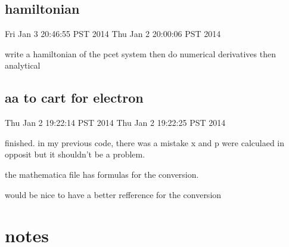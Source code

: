 \documentclass{article}
\begin{document}
\subsection{hamiltonian}
Fri Jan  3 20:46:55 PST 2014
Thu Jan  2 20:00:06 PST 2014
\label{sub:hamiltonian}

write a hamiltonian of the pcet system then do numerical derivatives then analytical

\subsection{aa to cart for electron}
Thu Jan  2 19:22:14 PST 2014
Thu Jan  2 19:22:25 PST 2014
\label{sub:aa_to_cart_for_electron}

finished. in my previous code, there was a mistake x and p were calculaed in opposit but it shouldn't be a problem.

the mathematica file has formulas for the conversion. 

would be nice to have a better refference for the conversion

\section{notes}
\end{document}
